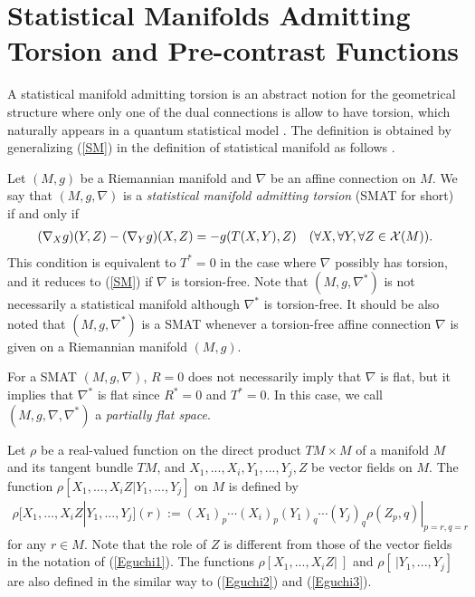 \documentclass[graybox]{svmult}
\begin{document}
\section{Statistical Manifolds Admitting Torsion and Pre-contrast Functions}
\label{sec:3}
A statistical manifold admitting torsion is an abstract notion for the geometrical structure
where only one of the dual connections is allow to have torsion, which naturally appears in
a quantum statistical model \cite{AN}. The definition is obtained by generalizing (\ref{SM})
in the definition of statistical manifold as follows \cite{Ku2}.

Let $(M,g)$ be a Riemannian manifold and $\nabla$ be an affine connection on $M$.
We say that $(M,g,\nabla)$ is a {\em statistical manifold admitting torsion} (SMAT for short)
if and only if
%
\begin{eqnarray}\label{SMAT}
   (\nabla_{X}g)(Y,Z) - (\nabla_{Y}g)(X,Z) = -g(T(X,Y),Z) \ \ \
   (\forall X,\forall Y,\forall Z \in {\cal X}(M)).
\end{eqnarray}
%
This condition is equivalent to $T^{\ast}=0$ in the case where $\nabla$ possibly has torsion,
and it reduces to (\ref{SM}) if $\nabla$ is torsion-free.
Note that $(M,g,\nabla^{\ast})$ is not necessarily a statistical manifold although $\nabla^{\ast}$
is torsion-free. It should be also noted that $(M,g,\nabla^{\ast})$ is a SMAT whenever a
torsion-free affine connection $\nabla$ is given on a Riemannian manifold $(M,g)$.

For a SMAT $(M,g,\nabla)$, $R=0$ does not necessarily imply that $\nabla$ is flat, but it
implies that $\nabla^{\ast}$ is flat since $R^{\ast}=0$ and $T^{\ast}=0$. In this case,
we call $(M,g,\nabla,\nabla^{\ast})$ a {\em partially flat space}.

Let $\rho$ be a real-valued function on the direct product $TM \times M$ of a manifold
$M$ and its tangent bundle $TM$, and $X_1,...,X_i,Y_1,...,Y_j,Z$ be vector fields on $M$.
The function $\rho[X_1,...,X_iZ|Y_1,...,Y_j]$ on $M$ is defined by
%
\begin{eqnarray*}
   \rho[X_1,\ldots,X_iZ | Y_1,\ldots,Y_j](r) := (X_1)_p \cdots (X_i)_p(Y_1)_q \cdots (Y_j)_q
\rho(Z_p,q)|_{p=r,q=r}
\end{eqnarray*}
%
for any $r \in M$.
Note that the role of $Z$ is different from those of the vector fields in the notation of 
(\ref{Eguchi1}). The functions $\rho[X_1,...,X_iZ| \ ]$ and $\rho[ \ |Y_1,...,Y_j]$ are also
defined in the similar way to (\ref{Eguchi2}) and (\ref{Eguchi3}).
\end{document}
